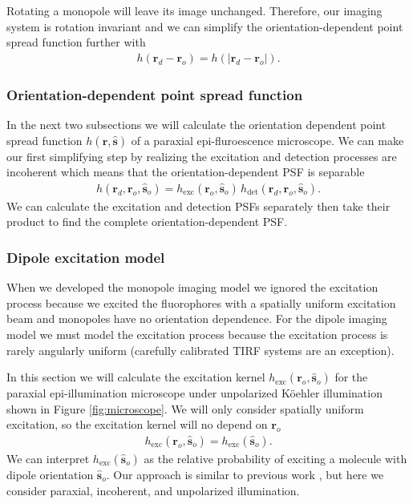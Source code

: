 \documentclass{osa-article}
\providecommand{\mb}[1]{\mathbf{#1}}
\providecommand{\ro}{\mathbf{\mathbf{r}}_o}
\providecommand{\so}{\mathbf{\hat{s}}_o}
\providecommand{\rd}{\mathbf{r}_d}
\providecommand{\mh}[1]{\mathbf{\hat{#1}}}
\begin{document}
Rotating a monopole will leave its image unchanged. Therefore, our imaging
system is rotation invariant and we can simplify the orientation-dependent point spread function further with
\begin{align}
  h(\rd - \ro) = h(|\rd - \ro|). \label{eq:rotational}
\end{align}

\subsubsection{Orientation-dependent point spread function}
In the next two subsections we will calculate the orientation dependent point
spread function $h(\mb{r}, \mh{s})$ of a paraxial epi-fluroescence microscope.
We can make our first simplifying step by realizing the excitation and detection
processes are incoherent which means that the orientation-dependent PSF is
separable
\begin{align}
  h(\rd, \ro, \so) = h_{\text{exc}}(\ro, \so)\,h_{\text{det}}(\rd, \ro, \so). \label{eq:kernelsep}
\end{align}
We can calculate the excitation and detection PSFs separately then take their product to find the complete orientation-dependent PSF. 

\subsubsection{Dipole excitation model}
When we developed the monopole imaging model we ignored the excitation process
because we excited the fluorophores with a spatially uniform excitation beam and
monopoles have no orientation dependence. For the dipole imaging model we must
model the excitation process because the excitation process is rarely angularly
uniform (carefully calibrated TIRF systems are an exception).

In this section we will calculate the excitation kernel
$h_{\text{exc}}(\ro, \so)$ for the paraxial epi-illumination microscope under
unpolarized K\"{o}ehler illumination shown in Figure \ref{fig:microscope}. We
will only consider spatially uniform excitation, so the excitation kernel will
no depend on $\ro$
\begin{align}
  h_{\text{exc}}(\ro, \so) = h_{\text{exc}}(\so).
\end{align}
We can interpret $h_{\text{exc}}(\so)$ as the relative probability of exciting a
molecule with dipole orientation $\so$. Our approach is similar to previous work
\cite{fourkas2001, chandler2017}, but here we consider paraxial, incoherent, and
unpolarized illumination.
\end{document}
